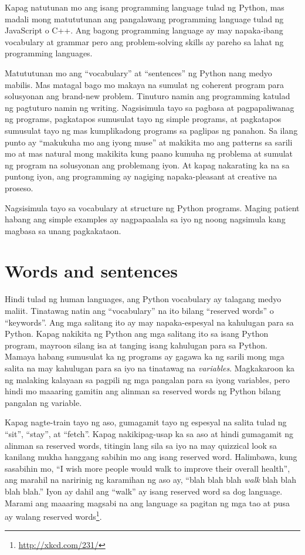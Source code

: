 \documentclass[10pt,]{book}
\begin{document}
Kapag natutunan mo ang isang programming language tulad ng Python, mas
madali mong matututunan ang pangalawang programming language tulad ng
JavaScript o C++. Ang bagong programming language ay may napaka-ibang
vocabulary at grammar pero ang problem-solving skills ay pareho sa lahat
ng programming languages.

Matututunan mo ang ``vocabulary'' at ``sentences'' ng Python nang medyo
mabilis. Mas matagal bago mo makaya na sumulat ng coherent program para
solusyonan ang brand-new problem. Tinuturo namin ang programming katulad
ng pagtuturo namin ng writing. Nagsisimula tayo sa pagbasa at
pagpapaliwanag ng programs, pagkatapos sumusulat tayo ng simple
programs, at pagkatapos sumusulat tayo ng mas kumplikadong programs sa
paglipas ng panahon. Sa ilang punto ay ``makukuha mo ang iyong muse'' at
makikita mo ang patterns sa sarili mo at mas natural mong makikita kung
paano kumuha ng problema at sumulat ng program na solusyonan ang
problemang iyon. At kapag nakarating ka na sa puntong iyon, ang
programming ay nagiging napaka-pleasant at creative na proseso.

Nagsisimula tayo sa vocabulary at structure ng Python programs. Maging
patient habang ang simple examples ay nagpapaalala sa iyo ng noong
nagsimula kang magbasa sa unang pagkakataon.

\section{Words and sentences}\label{words-and-sentences}

 
 

Hindi tulad ng human languages, ang Python vocabulary ay talagang medyo
maliit. Tinatawag natin ang ``vocabulary'' na ito bilang ``reserved
words'' o ``keywords''. Ang mga salitang ito ay may napaka-espesyal na
kahulugan para sa Python. Kapag nakikita ng Python ang mga salitang ito
sa isang Python program, mayroon silang isa at tanging isang kahulugan
para sa Python. Mamaya habang sumusulat ka ng programs ay gagawa ka ng
sarili mong mga salita na may kahulugan para sa iyo na tinatawag na
\emph{variables}. Magkakaroon ka ng malaking kalayaan sa pagpili ng mga
pangalan para sa iyong variables, pero hindi mo maaaring gamitin ang
alinman sa reserved words ng Python bilang pangalan ng variable.

Kapag nagte-train tayo ng aso, gumagamit tayo ng espesyal na salita
tulad ng ``sit'', ``stay'', at ``fetch''. Kapag nakikipag-usap ka sa aso
at hindi gumagamit ng alinman sa reserved words, titingin lang sila sa
iyo na may quizzical look sa kanilang mukha hanggang sabihin mo ang
isang reserved word. Halimbawa, kung sasabihin mo, ``I wish more people
would walk to improve their overall health'', ang marahil na naririnig
ng karamihan ng aso ay, ``blah blah blah \emph{walk} blah blah blah
blah.'' Iyon ay dahil ang ``walk'' ay isang reserved word sa dog
language. Marami ang maaaring magsabi na ang language sa pagitan ng mga
tao at pusa ay walang reserved words\footnote{\url{http://xkcd.com/231/}}.
\end{document}
